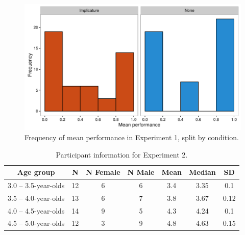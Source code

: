 \documentclass[man]{apa2}
\begin{document}
{\newpage

\begin{figure}
 \begin{center}
  \includegraphics[width=6in]{figures/exp1_hist.pdf}
  \caption{\label{fig:imp_hist} Frequency of mean performance in Experiment 1, split by condition.}
 \end{center}
\end{figure}

\newpage

\begin{table}
\centering
\begin{tabular}{ccccccc}
\hline
{\bf Age group} & {\bf N} & {\bf N Female} & {\bf N Male} & {\bf Mean} & {\bf Median} & {\bf SD} \\
\hline
3.0 -- 3.5-year-olds & 12 & 6 & 6 & 3.4 & 3.35 & 0.1\\
3.5 -- 4.0-year-olds & 13 & 6 & 7 & 3.8 & 3.67 & 0.12\\
4.0 -- 4.5-year-olds & 14 & 9 & 5 & 4.3 & 4.24 & 0.1\\
4.5 -- 5.0-year-olds & 12 & 3 & 9 & 4.8 & 4.63 & 0.15\\
\hline
\end{tabular}
\caption{\label{tab:exp_2_demo}Participant information for Experiment 2.}
\end{table}

\newpage

}
\end{document}
